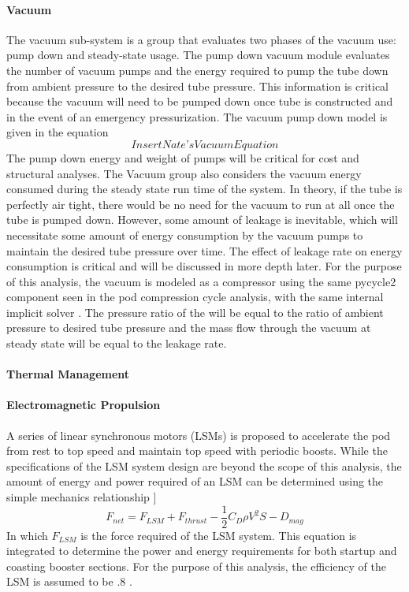 \paragraph{Vacuum}
	The vacuum sub-system is a group that evaluates two phases of the vacuum use: pump down and steady-state usage. The pump down vacuum module evaluates the number of vacuum pumps and the energy required to pump the tube down from ambient pressure to the desired tube pressure. This information is critical because the vacuum will need to be pumped down once tube is constructed and in the event of an emergency pressurization. The vacuum pump down model is given in the equation 
	\begin{equation}
		\label{eq:vacuum}
		Insert Nate’s Vacuum Equation
	\end{equation}
	The pump down energy and weight of pumps will be critical for cost and structural analyses.
	The Vacuum group also considers the vacuum energy consumed during the steady state run time of the system. In theory, if the tube is perfectly air tight, there would be no need for the vacuum to run at all once the tube is pumped down. However, some amount of leakage is inevitable, which will necessitate some amount of energy consumption by the vacuum pumps to maintain the desired tube pressure over time. The effect of leakage rate on energy consumption is critical and will be discussed in more depth later. For the purpose of this analysis, the vacuum is modeled as a compressor using the same pycycle2 component seen in the pod compression cycle analysis, with the same internal implicit solver \cite{pycycle2}. The pressure ratio of the will be equal to the ratio of ambient pressure to desired tube pressure and the mass flow through the vacuum at steady state will be equal to the leakage rate.
\paragraph{Thermal Management}
	  \cite{Chin}
\paragraph{Electromagnetic Propulsion}
	A series of linear synchronous motors (LSMs) is proposed to accelerate the pod from rest to top speed and maintain top speed with periodic boosts. While the specifications of the LSM system design are beyond the scope of this analysis, the amount of energy and power required of an LSM can be determined using the simple mechanics relationship ]
	\begin{equation}
		\label{eq:sum_of_forces}
		F_{net} = F_{LSM} + F_{thrust} - \frac{1}{2}C_{D}\rho V^{2}S - D_{mag}
	\end{equation}
	In which $F_{LSM}$ is the force required of the LSM system. This equation is integrated to determine the power and energy requirements for both startup and coasting booster sections. For the purpose of this analysis, the efficiency of the LSM is assumed to be .8 \cite{LSM}.

